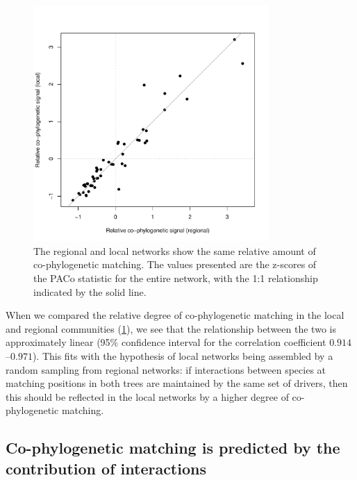 \documentclass[11pt,serif]{article}
\begin{document}
\begin{figure}[htbp]
\centering
\includegraphics[width=0.80000\textwidth]{figure/localregional-1.pdf}
\caption{The regional and local networks show the same relative amount
of co-phylogenetic matching. The values presented are the z-scores of
the PACo statistic for the entire network, with the 1:1 relationship
indicated by the solid line.\label{fig:relative}}
\end{figure}

When we compared the relative degree of co-phylogenetic matching in the
local and regional communities (\cref{fig:relative}), we
see that the relationship between the two is approximately linear (95\%
confidence interval for the correlation coefficient
\(0.914\)--\(0.971\)). This fits with the hypothesis of local networks
being assembled by a random sampling from regional networks: if
interactions between species at matching positions in both trees are
maintained by the same set of drivers, then this should be reflected in
the local networks by a higher degree of co-phylogenetic matching.

\subsection{Co-phylogenetic matching is predicted by the contribution of
interactions}\label{co-phylogenetic-matching-is-predicted-by-the-contribution-of-interactions}
\end{document}
